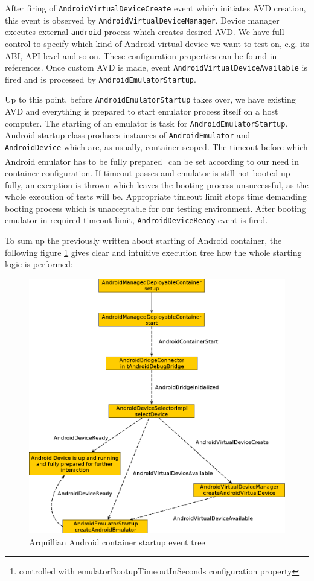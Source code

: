 \documentclass[12pt,final,oneside]{fithesis}
\begin{document}
After firing of \texttt{AndroidVirtualDeviceCreate} event which initiates AVD creation, this event is observed by \texttt{AndroidVirtualDeviceManager}. Device manager executes external \texttt{android} process which creates desired AVD. We have full control to specify which kind of Android virtual device we want to test on, e.g. its ABI, API level and so on. These configuration properties can be found in references. Once custom AVD is made, event \texttt{AndroidVirtualDeviceAvailable} is fired and is processed by \texttt{AndroidEmulatorStartup}.

Up to this point, before \texttt{AndroidEmulatorStartup} takes over, we have existing AVD and everything is prepared to start emulator process itself on a host computer. The starting of an emulator is task for \texttt{AndroidEmulatorStartup}. Android startup class produces instances of \texttt{AndroidEmulator} and \texttt{AndroidDevice} which are, as usually, container scoped. The timeout before which Android emulator has to be fully prepared\footnote{controlled with emulatorBootupTimeoutInSeconds configuration property} can be set according to our need in container configuration. If timeout passes and emulator is still not booted up fully, an exception is thrown which leaves the booting process unsuccessful, as the whole execution of tests will be. Appropriate timeout limit stops time demanding booting process which is unacceptable for our testing environment. After booting emulator in required timeout limit, \texttt{AndroidDeviceReady} event is fired.

To sum up the previously written about starting of Android container, the following figure \ref{fig:container_startup} gives clear and intuitive execution tree how the whole starting logic is performed:

\begin{figure}[!ht]
	\centering
	\includegraphics[width=120mm]{img/container-startup.png}
	\caption{Arquillian Android container startup event tree}
	\label{fig:container_startup}
\end{figure}
\end{document}
